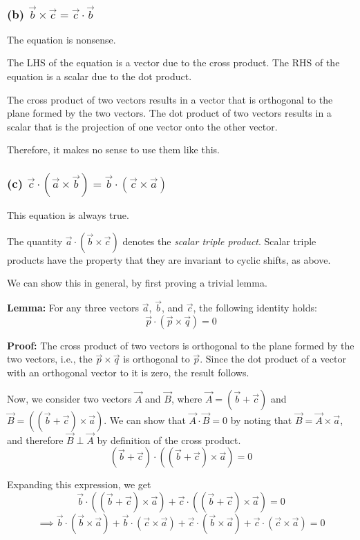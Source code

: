\subsubsection*{(b) \( \vec{b} \times \vec{c} = \vec{c} \cdot \vec{b} \)}

The equation is nonsense.

The LHS of the equation is a vector due to the cross product.
The RHS of the equation is a scalar due to the dot product.

The cross product of two vectors results in a vector that is orthogonal to the plane formed by the two vectors.
The dot product of two vectors results in a scalar that is the projection of one vector onto the other vector.

Therefore, it makes no sense to use them like this.

\subsubsection*{(c) \( \vec{c} \cdot (\vec{a} \times \vec{b}) = \vec{b} \cdot (\vec{c} \times \vec{a}) \)}

This equation is always true.

The quantity \( \vec{a} \cdot (\vec{b} \times \vec{c}) \) denotes the \textit{scalar triple product}.
Scalar triple products have the property that they are invariant to cyclic shifts, as above.

We can show this in general, by first proving a trivial lemma.

\textbf{Lemma:} For any three vectors \( \vec{a} \), \( \vec{b} \), and \( \vec{c} \), the following identity holds:
\begin{equation*}
    \vec{p} \cdot (\vec{p} \times \vec{q}) = 0
\end{equation*}

\textbf{Proof:}
The cross product of two vectors is orthogonal to the plane formed by the two vectors, i.e., the \( \vec{p} \times \vec{q} \) is orthogonal to \( \vec{p} \).
Since the dot product of a vector with an orthogonal vector to it is zero, the result follows.

Now, we consider two vectors \( \vec{A} \) and \( \vec{B} \), where \( \vec{A} = (\vec{b} + \vec{c}) \) and \( \vec{B} = ((\vec{b} + \vec{c}) \times \vec{a}) \).
We can show that \( \vec{A} \cdot \vec{B} = 0 \) by noting that \( \vec{B} = \vec{A} \times \vec{a} \), and therefore \( \vec{B} \perp \vec{A} \) by definition of the cross product.
\begin{equation*}
    (\vec{b} + \vec{c}) \cdot ((\vec{b} + \vec{c}) \times \vec{a}) = 0
\end{equation*}

Expanding this expression, we get
\[
    \vec{b} \cdot ((\vec{b} + \vec{c}) \times \vec{a}) + \vec{c} \cdot ((\vec{b} + \vec{c}) \times \vec{a}) = 0
\]
\[
    \implies \vec{b} \cdot (\vec{b} \times \vec{a}) + \vec{b} \cdot (\vec{c} \times \vec{a}) + \vec{c} \cdot (\vec{b} \times \vec{a}) + \vec{c} \cdot (\vec{c} \times \vec{a}) = 0
\]
